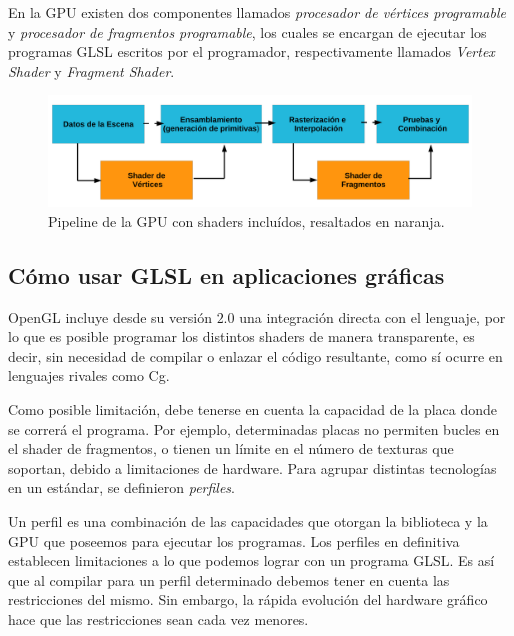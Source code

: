 En la GPU existen dos componentes llamados {\em procesador de v\'ertices programable} y {\em procesador de fragmentos programable}, los cuales se encargan de ejecutar los programas GLSL escritos por el programador, respectivamente llamados {\em Vertex Shader} y {\em Fragment Shader}.

\begin{figure}[h]
\begin{center}
\includegraphics[width=13cm]{figures/pipelinegrafico}
\end{center}
\caption[Pipeline de la GPU con shaders incluídos]{Pipeline de la GPU con shaders incluídos, resaltados en naranja.}
\label{fg:pipelinegrafico}
\end{figure}


\subsection{C\'omo usar GLSL en aplicaciones gr\'aficas}
OpenGL incluye desde su versión $2.0$ una integración directa con el lenguaje, por lo que es posible programar los distintos shaders de manera transparente, es decir, sin necesidad de compilar o enlazar el código resultante, como sí ocurre en lenguajes rivales como Cg.

Como posible limitación, debe tenerse en cuenta la capacidad de la placa donde se correrá el programa.
Por ejemplo, determinadas placas no permiten bucles en el shader de fragmentos, o tienen un límite en el número de texturas que soportan, debido a limitaciones de hardware.
Para agrupar distintas tecnologías en un estándar, se definieron {\em perfiles}.

Un perfil es una combinaci\'on de las capacidades que otorgan la biblioteca y la GPU que poseemos para ejecutar los programas. Los perfiles en definitiva establecen limitaciones a lo que podemos lograr con un programa GLSL. Es as\'i que al compilar para un perfil determinado debemos tener en cuenta las restricciones del mismo. Sin embargo, la r\'apida evoluci\'on del hardware gr\'afico hace que las restricciones sean cada vez menores.

